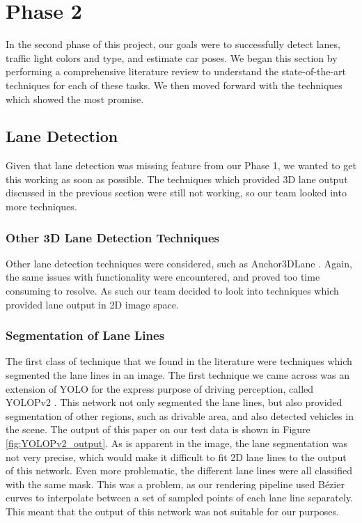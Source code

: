 \section{Phase 2}

In the second phase of this project, our goals were to successfully detect lanes, traffic light colors and type, and estimate car poses. We began this section by performing a comprehensive literature review to understand the state-of-the-art techniques for each of these tasks. We then moved forward with the techniques which showed the most promise.


\subsection{Lane Detection}
Given that lane detection was missing feature from our Phase 1, we wanted to get this working as soon as possible. The techniques which provided 3D lane output discussed in the previous section were still not working, so our team looked into more techniques. 

\subsubsection{Other 3D Lane Detection Techniques}
Other lane detection techniques were considered, such as Anchor3DLane \cite{Anchor3DLane}. Again, the same issues with functionality were encountered, and proved too time consuming to resolve. As such our team decided to look into techniques which provided lane output in 2D image space.

\subsubsection{Segmentation of Lane Lines}
The first class of technique that we found in the literature were techniques which segmented the lane lines in an image. The first technique we came across was an extension of YOLO for the express purpose of driving perception, called YOLOPv2 \cite{YOLOPv2}. This network not only segmented the lane lines, but also provided segmentation of other regions, such as drivable area, and also detected vehicles in the scene. The output of this paper on our test data is shown in Figure \ref{fig:YOLOPv2_output}. As is apparent in the image, the lane segmentation was not very precise, which would make it difficult to fit 2D lane lines to the output of this network. Even more problematic, the different lane lines were all classified with the same mask. This was a problem, as our rendering pipeline used Bézier curves to interpolate between a set of sampled points of each lane line separately. This meant that the output of this network was not suitable for our purposes.

